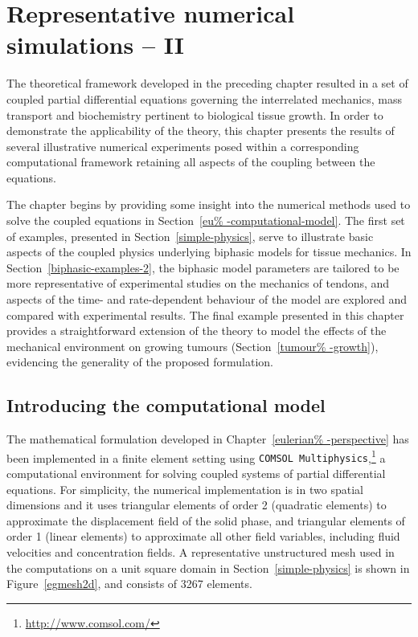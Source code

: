 \chapter{Representative numerical simulations -- II}
\label{numerical-simulations-2}

The theoretical framework developed in the preceding chapter resulted
in a set of coupled partial differential equations governing the
interrelated mechanics, mass transport and biochemistry pertinent to
biological tissue growth. In order to demonstrate the applicability of
the theory, this chapter presents the results of several illustrative
numerical experiments posed within a corresponding computational
framework retaining all aspects of the coupling between the equations.

The chapter begins by providing some insight into the numerical
methods used to solve the coupled equations in Section~\ref{eu%
  -computational-model}. The first set of examples, presented in
Section~\ref{simple-physics}, serve to illustrate basic aspects of the
coupled physics underlying biphasic models for tissue mechanics. In
Section~\ref{biphasic-examples-2}, the biphasic model parameters are
tailored to be more representative of experimental studies on the
mechanics of tendons, and aspects of the time- and rate-dependent
behaviour of the model are explored and compared with experimental
results. The final example presented in this chapter provides a
straightforward extension of the theory to model the effects of the
mechanical environment on growing tumours (Section~\ref{tumour%
  -growth}), evidencing the generality of the proposed formulation.

\section{Introducing the computational model}
\label{eu-computational-model}

The mathematical formulation developed in Chapter~\ref{eulerian%
  -perspective} has been implemented in a finite element setting using
{\tt COMSOL Multiphysics},\footnote{\href {http://www.comsol.com/}
  {http://www.comsol.com/}} a computational environment for solving
coupled systems of partial differential equations. For simplicity, the
numerical implementation is in two spatial dimensions and it uses
triangular elements of order 2 (quadratic elements) to approximate the
displacement field of the solid phase, and triangular elements of
order 1 (linear elements) to approximate all other field variables,
including fluid velocities and concentration fields. A representative
unstructured mesh used in the computations on a unit square domain in
Section~\ref{simple-physics} is shown in Figure~\ref{egmesh2d}, and
consists of 3267 elements.

